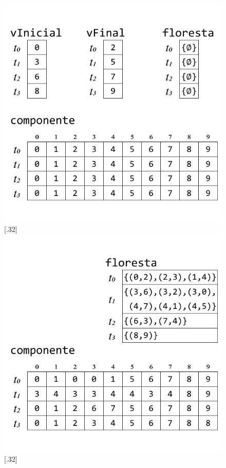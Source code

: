 \documentclass[12pt]{article}
\begin{document}
\begin{figure}[h]
{		\includegraphics[width=\linewidth]{c.pdf}
	}
	\subcaptionbox{}[.32\textwidth]
	{
		\includegraphics[width=\linewidth]{d.pdf}
	}
	\subcaptionbox{}[.32\textwidth]
	{
}
\end{figure}
\end{document}
